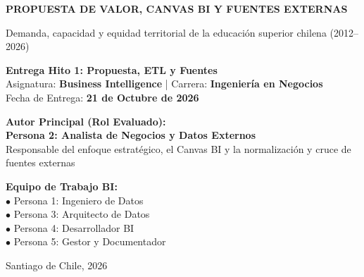 \documentclass[11pt,a4paper]{article}
\begin{document}
\begin{titlepage}
    \centering
    \vspace*{1cm}
    {\Huge \bfseries \color{primaryblue} PROPUESTA DE VALOR, CANVAS BI Y FUENTES EXTERNAS\par}
    \vspace{0.4cm}
    {\LARGE \color{secondaryblue} Demanda, capacidad y equidad territorial de la educaci\'on superior chilena (2012--2026)\par}
    \vspace{1cm}

    \begin{tcolorbox}[colback=lightbg, colframe=primaryblue, width=\textwidth, arc=3mm]
        \centering
        \large \textbf{Entrega Hito 1: Propuesta, ETL y Fuentes}\\[2mm]
        \normalsize Asignatura: \textbf{Business Intelligence} | Carrera: \textbf{Ingenier\'ia en Negocios}\\[1mm]
        Fecha de Entrega: \textbf{21 de Octubre de 2026}
    \end{tcolorbox}

    \vspace{2cm}
    \begin{minipage}{0.45\textwidth}
        \textbf{Autor Principal (Rol Evaluado):}\\
        \textbf{\color{primaryblue}Persona 2: Analista de Negocios y Datos Externos}\\
        Responsable del enfoque estrat\'egico, el Canvas BI y la normalizaci\'on y cruce de fuentes externas
    \end{minipage}
    \hfill
    \begin{minipage}{0.45\textwidth}
        \textbf{Equipo de Trabajo BI:}\\
        $\bullet$ Persona 1: Ingeniero de Datos\\
        $\bullet$ Persona 3: Arquitecto de Datos\\
        $\bullet$ Persona 4: Desarrollador BI\\
        $\bullet$ Persona 5: Gestor y Documentador
    \end{minipage}

    \vfill
    {\small \color{darkgray} Santiago de Chile, 2026}\par
\end{titlepage}
\end{document}
